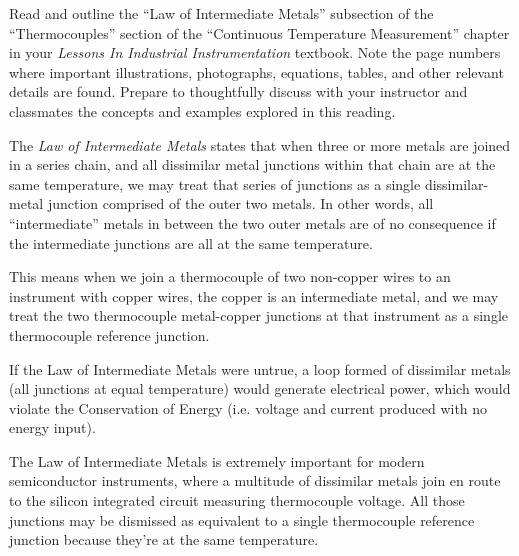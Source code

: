 

Read and outline the ``Law of Intermediate Metals'' subsection of the ``Thermocouples'' section of the ``Continuous Temperature Measurement'' chapter in your {\it Lessons In Industrial Instrumentation} textbook.  Note the page numbers where important illustrations, photographs, equations, tables, and other relevant details are found.  Prepare to thoughtfully discuss with your instructor and classmates the concepts and examples explored in this reading.















The {\it Law of Intermediate Metals} states that when three or more metals are joined in a series chain, and all dissimilar metal junctions within that chain are at the same temperature, we may treat that series of junctions as a single dissimilar-metal junction comprised of the outer two metals.  In other words, all ``intermediate'' metals in between the two outer metals are of no consequence if the intermediate junctions are all at the same temperature.

This means when we join a thermocouple of two non-copper wires to an instrument with copper wires, the copper is an intermediate metal, and we may treat the two thermocouple metal-copper junctions at that instrument as a single thermocouple reference junction.  

\vskip 10pt

If the Law of Intermediate Metals were untrue, a loop formed of dissimilar metals (all junctions at equal temperature) would generate electrical power, which would violate the Conservation of Energy (i.e. voltage and current produced with no energy input).

\vskip 10pt

The Law of Intermediate Metals is extremely important for modern semiconductor instruments, where a multitude of dissimilar metals join en route to the silicon integrated circuit measuring thermocouple voltage.  All those junctions may be dismissed as equivalent to a single thermocouple reference junction because they're at the same temperature.





